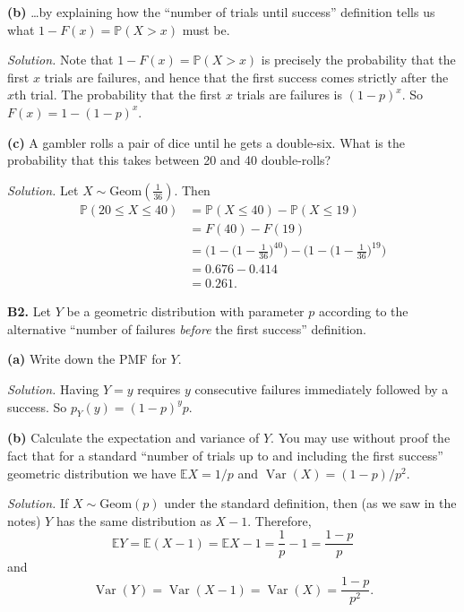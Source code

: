 \documentclass[
  a4paper,
]{book}
\theoremstyle{definition}
\theoremstyle{definition}
\theoremstyle{definition}
\theoremstyle{definition}
\theoremstyle{remark}
\begin{document}
\textbf{(b)} \ldots by explaining how the ``number of trials until success'' definition tells us what \(1 - F(x) = \mathbb P(X > x)\) must be.

\begin{myanswers}
\emph{Solution.}
Note that \(1 - F(x) = \mathbb P(X > x)\) is precisely the probability that the first \(x\) trials are failures, and hence that the first success comes strictly after the \(x\)th trial. The probability that the first \(x\) trials are failures is \((1-p)^x\). So \(F(x) = 1 - (1-p)^x\).

\end{myanswers}

\textbf{(c)} A gambler rolls a pair of dice until he gets a double-six. What is the probability that this takes between 20 and 40 double-rolls?

\begin{myanswers}
\emph{Solution.}
Let \(X \sim \text{Geom}(\frac{1}{36})\). Then
\begin{align*}
\mathbb P(20 \leq X \leq 40) &= \mathbb P(X \leq 40) - \mathbb P(X \leq 19) \\
  &= F(40) - F(19) \\
  &= \bigg(1 - \big(1 - \tfrac{1}{36})^{40}\bigg) - \bigg(1 - \big(1 - \tfrac{1}{36})^{19}\bigg) \\
  &= 0.676 - 0.414 \\
  &= 0.261.
\end{align*}

\end{myanswers}

\textbf{B2.} Let \(Y\) be a geometric distribution with parameter \(p\) according to the alternative ``number of failures \emph{before} the first success'' definition.

\textbf{(a)} Write down the PMF for \(Y\).

\begin{myanswers}
\emph{Solution.} Having \(Y = y\) requires \(y\) consecutive failures immediately followed by a success. So \(p_Y(y) = (1-p)^y p\).

\end{myanswers}

\textbf{(b)} Calculate the expectation and variance of \(Y\). You may use without proof the fact that for a standard ``number of trials up to and including the first success'' geometric distribution we have \(\mathbb EX = 1/p\) and \(\operatorname{Var}(X) = (1-p)/p^2\).

\begin{myanswers}
\emph{Solution.} If \(X \sim \text{Geom}(p)\) under the standard definition, then (as we saw in the notes) \(Y\) has the same distribution as \(X -1\). Therefore,
\[ \mathbb EY = \mathbb E(X-1) = \mathbb EX - 1 = \frac{1}{p} - 1 = \frac{1-p}{p} \]
and
\[ \operatorname{Var}(Y) = \operatorname{Var}(X -1) = \operatorname{Var}(X) = \frac{1-p}{p^2} .  \]

\end{myanswers}
\end{document}
